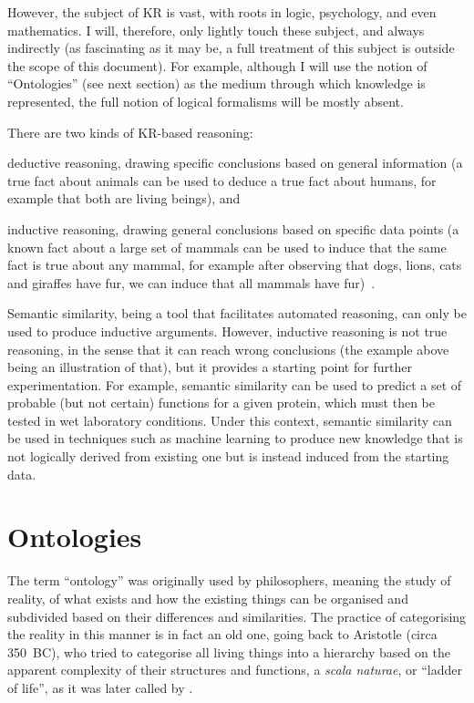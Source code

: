 However, the subject of KR is vast, with roots in logic, psychology, and even mathematics. I will, therefore, only lightly touch these subject, and always indirectly (as fascinating as it may be, a full treatment of this subject is outside the scope of this document). For example, although I will use the notion of ``Ontologies'' (see next section) as the medium through which knowledge is represented, the full notion of logical formalisms will be mostly absent.

There are two kinds of KR-based reasoning:
\begin{paralist}
    \item deductive reasoning, \ie drawing specific conclusions based on general information (a true fact about animals can be used to deduce a true fact about humans, for example that both are living beings), and
    \item inductive reasoning, \ie drawing general conclusions based on specific data points (a known fact about a large set of mammals can be used to induce that the same fact is true about any mammal, for example after observing that dogs, lions, cats and giraffes have fur, we can induce that all mammals have fur)~\citep[][chap.~1]{Overton2013}.
\end{paralist}
Semantic similarity, being a tool that facilitates automated reasoning, can only be used to produce inductive arguments. However, inductive reasoning is not true reasoning, in the sense that it can reach wrong conclusions (the example above being an illustration of that), but it provides a starting point for further experimentation. For example, semantic similarity can be used to predict a set of probable (but not certain) functions for a given protein, which must then be tested in wet laboratory conditions. Under this context, semantic similarity can be used in techniques such as machine learning to produce new knowledge that is not logically derived from existing one but is instead induced from the starting data.


\section{Ontologies} \label{sec:concepts/ontologies}

The term ``ontology'' was originally used by philosophers, meaning the study of reality, of what exists and how the existing things can be organised and subdivided based on their differences and similarities. The practice of categorising the reality in this manner is in fact an old one, going back to Aristotle (circa 350~BC), who tried to categorise all living things into a hierarchy based on the apparent complexity of their structures and functions, a \emph{scala naturae}, or ``ladder of life'', as it was later called by \citet{Singer1931}.


